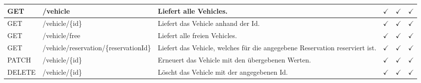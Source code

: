 \begin{xltabular}{\textwidth}{|l|l|X|c|c|c|}
    \hline
    GET & /vehicle & Liefert alle Vehicles. & $\checkmark$ & $\checkmark$ & $\checkmark$ \\
    \hline
    GET & /vehicle/\{id\} & Liefert das Vehicle anhand der Id. & $\checkmark$ & $\checkmark$ & $\checkmark$ \\
    \hline
    GET & /vehicle/free & Liefert alle freien Vehicles. & $\checkmark$ & $\checkmark$ & $\checkmark$ \\
    \hline
    GET & /vehicle/reservation/\{reservationId\} & Liefert das Vehicle, welches für die angegebene Reservation reserviert ist. & $\checkmark$ & $\checkmark$ & $\checkmark$ \\
    \hline
    PATCH & /vehicle/\{id\} & Erneuert das Vehicle mit den übergebenen Werten. & $\checkmark$ & $\checkmark$ & $\checkmark$ \\
    \hline
    DELETE & /vehicle/\{id\} & Löscht das Vehicle mit der angegebenen Id. & $\checkmark$ & $\checkmark$ & $\checkmark$ \\
    \hline
\end{xltabular}